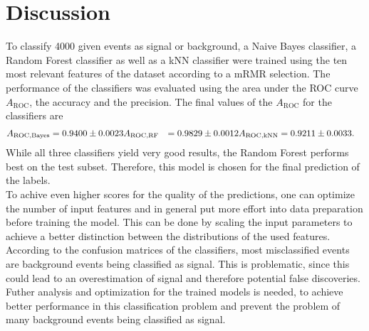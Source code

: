 \section{Discussion}
\label{sec:Discussion}

To classify 4000 given events as signal or background, a Naive Bayes classifier, a Random Forest classifier as well as a kNN classifier were 
trained using the ten most relevant features of the dataset according to a mRMR selection. The performance of the classifiers was evaluated using
the area under the ROC curve $A_{\mathrm{ROC}}$, the accuracy and the precision. The final values of the $A_{\mathrm{ROC}}$ for the classifiers are
\begin{align*}
    A_{\mathrm{ROC, Bayes}} &= \num{0.9400+-0.0023} 
    A_{\mathrm{ROC, RF}} &= \num{0.9829(0.0012)}
    A_{\mathrm{ROC, kNN}} &= \num{0.9211 \pm 0.0033}.
\end{align*}
While all three classifiers yield very good results, the Random Forest performs best on the test subset. Therefore, this model is chosen for the 
final prediction of the labels.\\
To achive even higher scores for the quality of the predictions, one can optimize the number of input features and in general put more
effort into data preparation before training the model. This can be done by scaling the input parameters to achieve a better distinction 
between the distributions of the used features.\\
According to the confusion matrices of the classifiers, most misclassified events are background events being classified as signal. This is
problematic, since this could lead to an overestimation of signal and therefore potential false discoveries.\\
Futher analysis and optimization for the trained models is needed, to achieve better performance in this classification problem and prevent
the problem of many background events being classified as signal.

